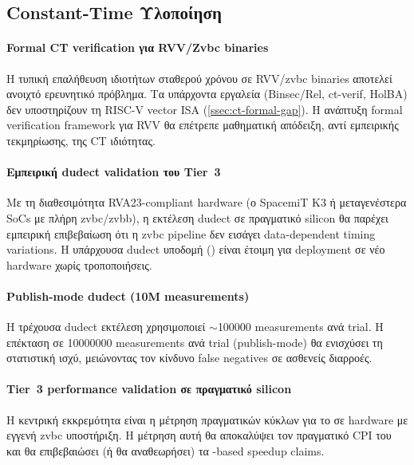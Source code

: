 \ifTODO
\subsection{Constant-Time Υλοποίηση}
\label{sec:future-ct}

\paragraph{Formal CT verification για RVV/Zvbc binaries}
Η τυπική επαλήθευση ιδιοτήτων σταθερού χρόνου σε RVV/\gls{zvbc} binaries αποτελεί
ανοιχτό ερευνητικό πρόβλημα. Τα υπάρχοντα εργαλεία (Binsec/Rel, ct-verif,
HolBA) δεν υποστηρίζουν τη RISC-V vector ISA
(\cref{ssec:ct-formal-gap}). Η ανάπτυξη formal verification
framework για RVV θα επέτρεπε μαθηματική απόδειξη, αντί εμπειρικής
τεκμηρίωσης, της CT ιδιότητας.

\paragraph{Εμπειρική dudect validation του Tier~3}
Με τη διαθεσιμότητα RVA23-compliant hardware (\eg ο SpacemiT K3 ή μεταγενέστερα SoCs με πλήρη
\gls{zvbc}/\gls{zvbb}), η εκτέλεση dudect σε πραγματικό silicon θα παρέχει εμπειρική
επιβεβαίωση ότι η \gls{zvbc} pipeline δεν εισάγει data-dependent timing variations.
Η υπάρχουσα dudect υποδομή () είναι έτοιμη για
deployment σε νέο hardware χωρίς τροποποιήσεις.

\paragraph{Publish-mode dudect (10M measurements)}
Η τρέχουσα dudect εκτέλεση χρησιμοποιεί $\sim$\num{100000} measurements ανά
trial. Η επέκταση σε \num{10000000} measurements ανά trial (publish-mode) θα
ενισχύσει τη στατιστική ισχύ, μειώνοντας τον κίνδυνο false negatives σε
ασθενείς διαρροές.
\fi


\paragraph{Tier~3 performance validation σε πραγματικό silicon}
Η κεντρική εκκρεμότητα είναι η μέτρηση πραγματικών κύκλων για το
 σε hardware με εγγενή \gls{zvbc} υποστήριξη. Η μέτρηση
αυτή θα αποκαλύψει τον πραγματικό CPI του  και θα
επιβεβαιώσει (ή θα αναθεωρήσει) τα \instret-based speedup claims.

